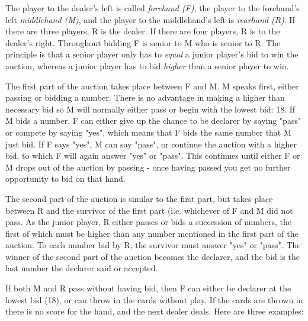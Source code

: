 \documentclass[letter]{article}
\begin{document}
  The player to the dealer's left is called \emph{forehand (F)}, the player to
  the forehand's left \emph{middlehand (M)}, and the player to the middlehand's
  left is \emph{rearhand (R)}. If there are three players, R is the dealer. If
  there are four players, R is to the dealer's right. Throughout bidding F is
  senior to M who is senior to R. The principle is that a senior player only has
  to \emph{equal} a junior player's bid to win the auction, whereas a junior
  player has to bid \emph{higher} than a senior player to win.

  The first part of the auction takes place between F and M. M speaks first,
  either passing or bidding a number. There is no advantage in making a higher
  than necessary bid so M will normally either pass or begin with the lowest
  bid: 18. If M bids a number, F can either give up the chance to be declarer by
  saying "pass" or compete by saying "yes", which means that F bids the same
  number that M just bid. If F says "yes", M can say "pass", or continue the
  auction with a higher bid, to which F will again answer "yes" or "pass".
  This continues until either F or M drops out of the auction by passing - once
  having passed you get no further opportunity to bid on that hand. 

  The second part of the auction is similar to the first part, but takes place
  between R and the survivor of the first part (i.e. whichever of F and M did
  not pass. As the junior player, R either passes or bids a succession of
  numbers, the first of which must be higher than any number mentioned in the
  first part of the auction. To each number bid by R, the survivor must answer
  "yes" or "pass". The winner of the second part of the auction becomes the
  declarer, and the bid is the last number the declarer said or accepted.

  If both M and R pass without having bid, then F can either be declarer at the
  lowest bid (18), or can throw in the cards without play. If the cards are
  thrown in there is no score for the hand, and the next dealer deals. Here are
  three examples:
\end{document}
